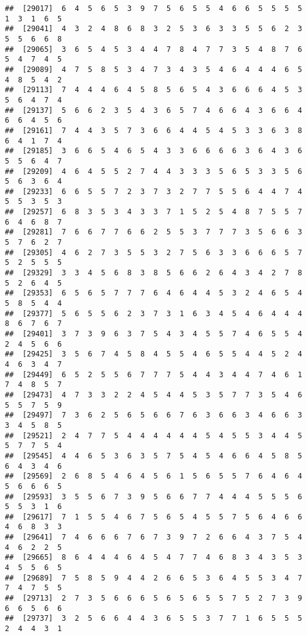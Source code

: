 \documentclass[
]{book}
\begin{document}
\begin{verbatim}
##  [29017]  6  4  5  6  5  3  9  7  5  6  5  5  4  6  6  5  5  5  5  1  3  1  6  5
##  [29041]  4  3  2  4  8  6  8  3  2  5  3  6  3  3  5  5  6  2  3  5  5  6  6  8
##  [29065]  3  6  5  4  5  3  4  4  7  8  4  7  7  3  5  4  8  7  6  5  4  7  4  5
##  [29089]  4  7  5  8  5  3  4  7  3  4  3  5  4  6  4  4  4  6  5  4  8  5  4  2
##  [29113]  7  4  4  4  6  4  5  8  5  6  5  4  3  6  6  6  4  5  3  5  6  4  7  4
##  [29137]  5  6  6  2  3  5  4  3  6  5  7  4  6  6  4  3  6  6  4  6  6  4  5  6
##  [29161]  7  4  4  3  5  7  3  6  6  4  4  5  4  5  3  3  6  3  8  6  4  1  7  4
##  [29185]  3  6  6  5  4  6  5  4  3  3  6  6  6  6  3  6  4  3  6  5  5  6  4  7
##  [29209]  4  6  4  5  5  2  7  4  4  3  3  3  5  6  5  3  3  5  6  5  6  3  6  4
##  [29233]  6  6  5  5  7  2  3  7  3  2  7  7  5  5  6  4  4  7  4  5  5  3  5  3
##  [29257]  6  8  3  5  3  4  3  3  7  1  5  2  5  4  8  7  5  5  7  6  4  6  8  7
##  [29281]  7  6  6  7  7  6  6  2  5  5  3  7  7  7  3  5  6  6  3  5  7  6  2  7
##  [29305]  4  6  2  7  3  5  5  3  2  7  5  6  3  3  6  6  6  5  7  5  2  5  5  5
##  [29329]  3  3  4  5  6  8  3  8  5  6  6  2  6  4  3  4  2  7  8  5  2  6  4  5
##  [29353]  6  5  6  5  7  7  7  6  4  6  4  4  5  3  2  4  6  5  4  5  8  5  4  4
##  [29377]  5  6  5  5  6  2  3  7  3  1  6  3  4  5  4  6  4  4  4  8  6  7  6  7
##  [29401]  3  7  3  9  6  3  7  5  4  3  4  5  5  7  4  6  5  5  4  2  4  5  6  6
##  [29425]  3  5  6  7  4  5  8  4  5  5  4  6  5  5  4  4  5  2  4  4  6  3  4  7
##  [29449]  6  5  2  5  5  6  7  7  7  5  4  4  3  4  4  7  4  6  1  7  4  8  5  7
##  [29473]  4  7  3  3  2  2  4  5  4  4  5  3  5  7  7  3  5  4  6  5  5  7  5  9
##  [29497]  7  3  6  2  5  6  5  6  6  7  6  3  6  6  3  4  6  6  3  3  4  5  8  5
##  [29521]  2  4  7  7  5  4  4  4  4  4  4  5  4  5  5  3  4  4  5  5  7  7  5  4
##  [29545]  4  4  6  5  3  6  3  5  7  5  4  5  4  6  6  4  5  8  5  6  4  3  4  6
##  [29569]  2  6  8  5  4  6  4  5  6  1  5  6  5  5  7  6  4  6  4  5  6  6  6  5
##  [29593]  3  5  5  6  7  3  9  5  6  6  7  7  4  4  4  5  5  5  6  5  5  3  1  6
##  [29617]  7  1  5  5  4  6  7  5  6  5  4  5  5  7  5  6  4  6  6  4  6  8  3  3
##  [29641]  7  4  6  6  6  7  6  7  3  9  7  2  6  6  4  3  7  5  4  4  6  2  2  5
##  [29665]  8  6  4  4  4  6  4  5  4  7  7  4  6  8  3  4  3  5  3  4  5  5  6  5
##  [29689]  7  5  8  5  9  4  4  2  6  6  5  3  6  4  5  5  3  4  7  7  4  7  5  5
##  [29713]  2  7  3  5  6  6  6  5  6  5  6  5  5  7  5  2  7  3  9  6  6  5  6  6
##  [29737]  3  2  5  6  6  4  4  3  6  5  5  3  7  7  1  6  5  5  5  2  4  4  3  1

\end{verbatim}
\end{document}
